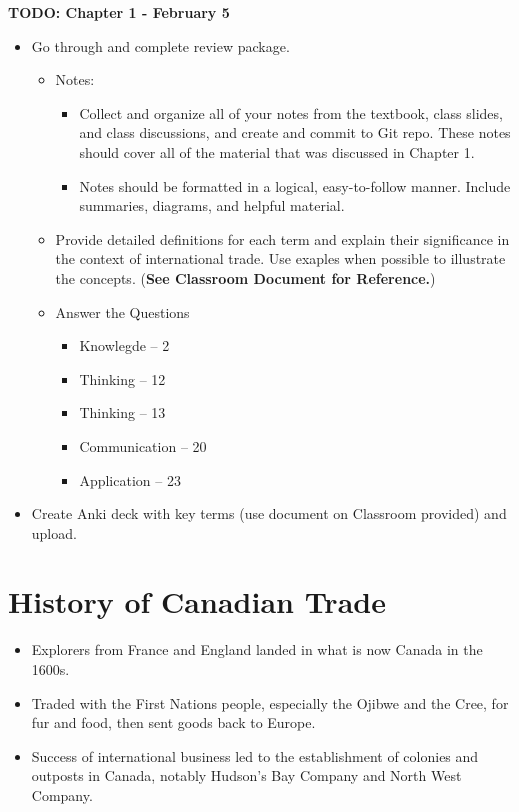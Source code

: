 
\textbf{TODO: Chapter 1 - February 5}
\begin{itemize}
    \item Go through and complete review package.
    \begin{itemize}
        \item Notes:
        \begin{itemize}
            \item Collect and organize all of your notes from the textbook, class slides, and class discussions, and create and commit to Git repo. These notes should cover all of the material that was discussed in Chapter 1.
            \item Notes should be formatted in a logical, easy-to-follow manner. Include summaries, diagrams, and helpful material.
        \end{itemize}
        \item Provide detailed definitions for each term and explain their significance in the context of international trade. Use exaples when possible to illustrate the concepts. (\textbf{See Classroom Document for Reference.})
        \item Answer the Questions
        \begin{itemize}
            \item Knowlegde -- 2
            \item Thinking -- 12
            \item Thinking -- 13
            \item Communication -- 20
            \item Application -- 23
        \end{itemize}
    \end{itemize}
    \item Create Anki deck with key terms (use document on Classroom provided) and upload.
\end{itemize}

\section{History of Canadian Trade}

\begin{itemize}
    \item Explorers from France and England landed in what is now Canada in the 1600s.
    \item Traded with the First Nations people, especially the Ojibwe and the Cree, for fur and food, then sent goods back to Europe.
    \item Success of international business led to the establishment of colonies and outposts in Canada, notably Hudson's Bay Company and North West Company.
\end{itemize}


